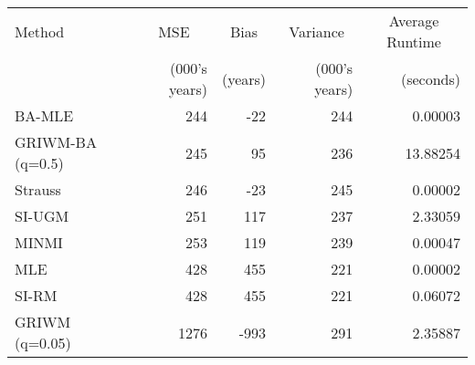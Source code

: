
\begin{tabular}{lrrrr}
\toprule
\multicolumn{1}{l}{Method} & \multicolumn{1}{c}{MSE} & \multicolumn{1}{c}{Bias} & \multicolumn{1}{c}{Variance} & \multicolumn{1}{c}{Average Runtime} \\
 & (000's years) & (years) & (000's years) & (seconds)\\
\midrule
BA-MLE & 244 & -22 & 244 & 0.00003\\
GRIWM-BA (q=0.5) & 245 & 95 & 236 & 13.88254\\
Strauss & 246 & -23 & 245 & 0.00002\\
SI-UGM & 251 & 117 & 237 & 2.33059\\
MINMI & 253 & 119 & 239 & 0.00047\\
\addlinespace
MLE & 428 & 455 & 221 & 0.00002\\
SI-RM & 428 & 455 & 221 & 0.06072\\
GRIWM (q=0.05) & 1276 & -993 & 291 & 2.35887\\
\bottomrule
\end{tabular}
